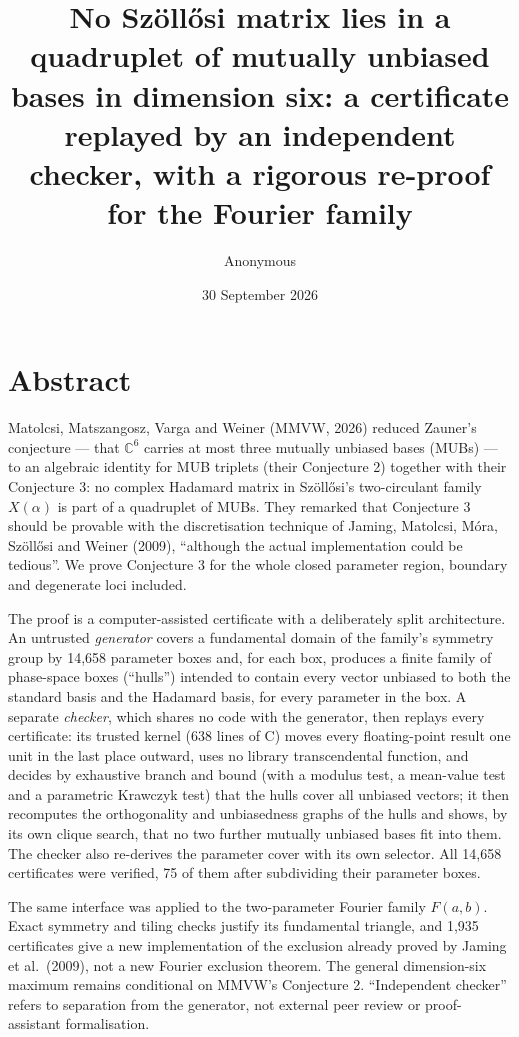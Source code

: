 \documentclass[
  11pt,
]{article}
\title{No Szöllősi matrix lies in a quadruplet of mutually unbiased
bases in dimension six: a certificate replayed by an independent
checker, with a rigorous re-proof for the Fourier family}
\author{Anonymous}
\date{30 September 2026}
\begin{document}
\maketitle

\section{Abstract}\label{abstract}

Matolcsi, Matszangosz, Varga and Weiner (MMVW, 2026) reduced Zauner's
conjecture --- that \(\mathbb C^6\) carries at most three mutually
unbiased bases (MUBs) --- to an algebraic identity for MUB triplets
(their Conjecture 2) together with their Conjecture 3: no complex
Hadamard matrix in Szöllősi's two-circulant family \(X(\alpha)\) is part
of a quadruplet of MUBs. They remarked that Conjecture 3 should be
provable with the discretisation technique of Jaming, Matolcsi, Móra,
Szöllősi and Weiner (2009), ``although the actual implementation could
be tedious''. We prove Conjecture 3 for the whole closed parameter
region, boundary and degenerate loci included.

The proof is a computer-assisted certificate with a deliberately split
architecture. An untrusted \emph{generator} covers a fundamental domain
of the family's symmetry group by 14,658 parameter boxes and, for each
box, produces a finite family of phase-space boxes (``hulls'') intended
to contain every vector unbiased to both the standard basis and the
Hadamard basis, for every parameter in the box. A separate
\emph{checker}, which shares no code with the generator, then replays
every certificate: its trusted kernel (638 lines of C) moves every
floating-point result one unit in the last place outward, uses no
library transcendental function, and decides by exhaustive branch and
bound (with a modulus test, a mean-value test and a parametric Krawczyk
test) that the hulls cover all unbiased vectors; it then recomputes the
orthogonality and unbiasedness graphs of the hulls and shows, by its own
clique search, that no two further mutually unbiased bases fit into
them. The checker also re-derives the parameter cover with its own
selector. All 14,658 certificates were verified, 75 of them after
subdividing their parameter boxes.

The same interface was applied to the two-parameter Fourier family
\(F(a,b)\). Exact symmetry and tiling checks justify its fundamental
triangle, and 1,935 certificates give a new implementation of the
exclusion already proved by Jaming et al.~(2009), not a new Fourier
exclusion theorem. The general dimension-six maximum remains conditional
on MMVW's Conjecture 2. ``Independent checker'' refers to separation
from the generator, not external peer review or proof-assistant
formalisation.
\end{document}
